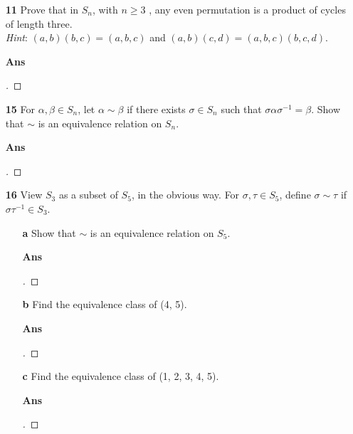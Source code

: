 \documentclass[paper=usletter, fontsize=12pt]{article}
\begin{document}
\begin{itemize}
\begin{itemize}
            \item[\textbf{11}] Prove that in $S_n$, with $n \ge 3$ , any even
            permutation is a product of cycles of length three.\\
            \textit{Hint}: $(a,b)(b,c)=(a,b,c)$ and
            $(a,b)(c,d)=(a,b,c)(b,c,d)$.
            \item[\textbf{Ans}]
            \begin{proof}[\unskip\nopunct]
            \end{proof}
            \vspace{0.2in}

            \item[\textbf{15}] For $\alpha,\beta \in  S_n$, let
            $\alpha\sim\beta$ if there exists $\sigma \in S_n$ such that
            $\sigma\alpha\sigma^{-1}=\beta$. Show that $\sim$ is an equivalence
            relation on $S_n$.
            \item[\textbf{Ans}]
            \begin{proof}[\unskip\nopunct]
            \end{proof}
            \vspace{0.2in}

            \item[\textbf{16}] View $S_3$ as a subset of $S_5$, in the obvious
            way. For $\sigma, \tau \in S_5$, define $\sigma \sim \tau$ if
            $\sigma\tau^{-1} \in S_3$.
            \begin{itemize}

                \item[\textbf{a}] Show that $\sim$ is an equivalence relation
                on $S_5$.
                \item[\textbf{Ans}]
                \begin{proof}[\unskip\nopunct]
                \end{proof}
                \vspace{0.2in}

                \item[\textbf{b}] Find the equivalence class of (4, 5).
                \item[\textbf{Ans}]
                \begin{proof}[\unskip\nopunct]
                \end{proof}
                \vspace{0.2in}

                \item[\textbf{c}] Find the equivalence class of (1, 2, 3, 4, 5).
                \item[\textbf{Ans}]
                \begin{proof}[\unskip\nopunct]
                \end{proof}
                \vspace{0.2in}


\end{itemize}
\end{itemize}
\end{itemize}
\end{document}
